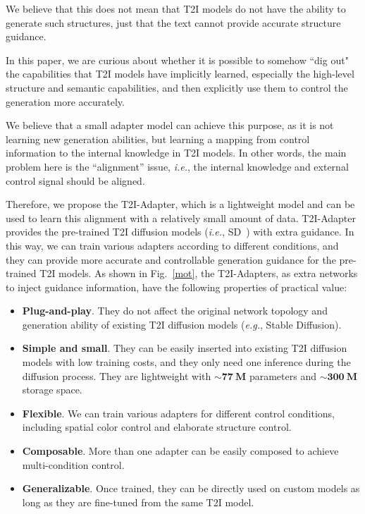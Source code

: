 We believe that this does not mean that T2I models do not have the ability to generate such structures, just that the text cannot provide accurate structure guidance.

In this paper, we are curious about whether it is possible  to somehow ``dig out" the capabilities that T2I models have implicitly learned, especially the high-level structure and semantic capabilities, and then explicitly use them to control the generation more accurately. 

We believe that a small adapter model can achieve this purpose, as it is not learning new generation abilities, but learning a mapping from control information to the internal knowledge in T2I models. In other words, the main problem here is the ``alignment'' issue, \textit{i.e.}, the internal knowledge and external control signal should be aligned.

Therefore, we propose the T2I-Adapter, which is a lightweight model and can be used to learn this alignment with a relatively small amount of data. T2I-Adapter provides the pre-trained T2I diffusion models (\textit{i.e.}, SD~\cite{ldm}) with extra guidance. In this way, we can train various adapters according to different conditions, and they can provide more accurate and controllable generation guidance for the pre-trained T2I models. As shown in Fig.~\ref{mot}, the T2I-Adapters, as extra networks to inject guidance information, have the following properties of practical value:

\begin{itemize}
    \item \textbf{Plug-and-play}. They do not affect the original network topology and generation ability of existing T2I diffusion models (\textit{e.g.}, Stable Diffusion).
    \item \textbf{Simple and small}. They can be easily inserted into existing T2I diffusion models with low training costs, and they only need one inference during the diffusion process. They are lightweight with $\sim\mathbf{77\ M}$ parameters and $\sim\mathbf{300\ M}$ storage space.

    \item \textbf{Flexible}. We can train various adapters for different control conditions, including spatial color control and elaborate structure control.

    \item \textbf{Composable}. More than one adapter can be easily composed to achieve multi-condition control.
    \item \textbf{Generalizable}. Once trained, they can be directly used on custom models as long as they are fine-tuned from the same T2I model. 

\end{itemize}

